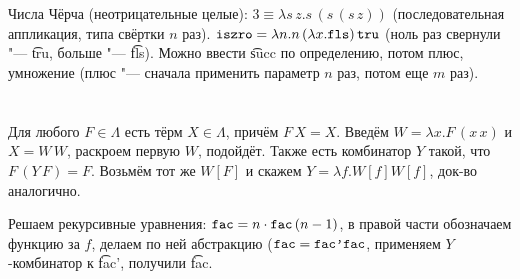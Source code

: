 \section{} %
Числа Чёрча (неотрицательные целые): $3\equiv \lambda s\,z.s\,(s\,(s\,z))$ (последовательная аппликация,
типа свёртки $n$ раз).
$\texttt{iszro}=\lambda n . n\,(\lambda x.\texttt{fls})\,\texttt{tru}$ (ноль раз свернули "--- \t{tru}, больше "--- \t{fls}).
Можно ввести \t{succ} по определению, потом плюс, умножение (плюс "--- сначала применить параметр $n$
раз, потом еще $m$ раз).

\section{} %
Для любого $F \in \Lambda$ есть тёрм $X \in \Lambda$, причём $F\, X = X$.
Введём $W=\lambda x . F\,(x\,x)$ и $X=W\,W$, раскроем первую $W$, подойдёт.
Также есть комбинатор $Y$ такой, что $F\,(Y\,F)=F$.
Возьмём тот же $W[F]$ и скажем $Y = \lambda f . W[f] W[f]$, док-во аналогично.

Решаем рекурсивные уравнения: $\texttt{fac} = n \cdot \texttt{fac}\,(n-1)$,
в правой части обозначаем функцию за $f$, делаем по ней абстракцию ($\texttt{fac} = \texttt{fac'} \texttt{fac}$,
применяем $Y$-комбинатор к \t{fac'}, получили \t{fac}.

\section{} %

\section{} %

\section{} %

\section{} %
